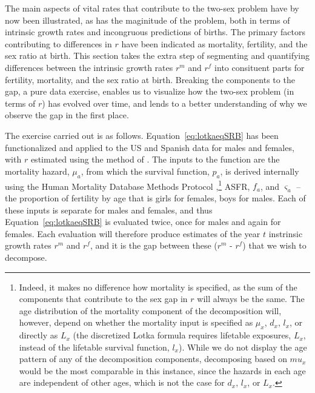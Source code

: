  \FloatBarrier
\label{sec:Decompr}
The main aspects of vital rates that contribute to the two-sex problem have by
now been illustrated, as has the maginitude of the problem, both in terms of
intrinsic growth rates and incongruous predictions of births. The primary
factors contributing to differences in $r$ have been indicated as mortality,
fertility, and the sex ratio at birth. This section takes the extra step of segmenting and
quantifying differences between the intrinsic growth rates $r^m$ and $r^f$ into
consituent parts for fertility, mortality, and the sex ratio at birth. Breaking
the components to the gap, a pure data exercise, enables us to
visualize how the two-sex problem (in terms of $r$) has evolved over time, and
lends to a better understanding of why we observe the gap in the first place.

The exercise carried out is as follows. Equation~\eqref{eq:lotkaeqSRB} has been
functionalized and applied to the US and Spanish data for males and females,
with $r$ estimated using the method of \citet{coale1957new}. The inputs to the
function are the mortality hazard, $\mu_a$, from which the survival function,
$p_a$, is derived internally using the Human Mortality Database Methods
Protocol \citep{wilmoth2007methods},\footnote{Indeed, it makes no difference how
mortality is specified, as the sum of the components that contribute to the
sex gap in $r$ will always be the same. The age distribution of the mortality
component of the decomposition will, however, depend on whether the
mortality input is specified as $\mu_x$, $d_x$, $l_x$, or directly as $L_x$ (the
discretized Lotka formula requires lifetable exposures, $L_x$, instead of the 
lifetable survival function, $l_x$). While we do not display the age pattern of
any of the decomposition components, decomposing based on $mu_x$ would be the
most comparable in this instance, since the hazards in each age are independent
of other ages, which is not the case for $d_x$, $l_x$, or $L_x$.} ASFR, $f_a$,
and $\varsigma _a$ -- the proportion of fertility by age that is girls for
females, boys for males. Each of these inputs is separate for males and females, and thus
Equation~\eqref{eq:lotkaeqSRB} is evaluated twice, once for males and again for
females. Each evaluation will therefore produce estimates of the year $t$
instrinsic growth rates $r^m$ and $r^f$, and it is the gap between
these ($r^m$ - $r^f$) that we wish to decompose.

